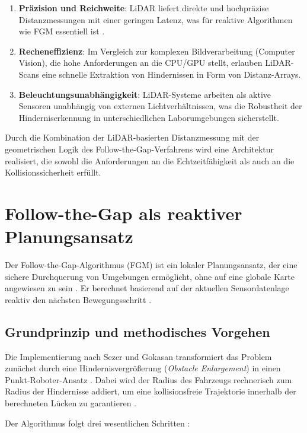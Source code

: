 \begin{enumerate}
    \item \textbf{Präzision und Reichweite}: LiDAR liefert direkte und hochpräzise Distanzmessungen mit einer geringen Latenz, was für reaktive Algorithmen wie FGM essentiell ist \cite{sezer2012}.
    \item \textbf{Recheneffizienz}: Im Vergleich zur komplexen Bildverarbeitung (Computer Vision), die hohe Anforderungen an die CPU/GPU stellt, erlauben LiDAR-Scans eine schnelle Extraktion von Hindernissen in Form von Distanz-Arrays.
    \item \textbf{Beleuchtungsunabhängigkeit}: LiDAR-Systeme arbeiten als aktive Sensoren unabhängig von externen Lichtverhältnissen, was die Robustheit der Hinderniserkennung in unterschiedlichen Laborumgebungen sicherstellt.
\end{enumerate}

Durch die Kombination der LiDAR-basierten Distanzmessung mit der geometrischen Logik des Follow-the-Gap-Verfahrens wird eine Architektur realisiert, die sowohl die Anforderungen an die Echtzeitfähigkeit als auch an die Kollisionssicherheit erfüllt.

\section{Follow-the-Gap als reaktiver Planungsansatz}

Der Follow-the-Gap-Algorithmus (FGM) ist ein lokaler Planungsansatz, der eine sichere Durchquerung von Umgebungen ermöglicht, ohne auf eine globale Karte angewiesen zu sein \cite{sezer2012}. Er berechnet basierend auf der aktuellen Sensordatenlage reaktiv den nächsten Bewegungsschritt \cite{sezer2012}.

\subsection{Grundprinzip und methodisches Vorgehen}

Die Implementierung nach Sezer und Gokasan transformiert das Problem zunächst durch eine Hindernisvergrößerung (\textit{Obstacle Enlargement}) in einen Punkt-Roboter-Ansatz \cite{sezer2012}. Dabei wird der Radius des Fahrzeugs rechnerisch zum Radius der Hindernisse addiert, um eine kollisionsfreie Trajektorie innerhalb der berechneten Lücken zu garantieren \cite{sezer2012}.

Der Algorithmus folgt drei wesentlichen Schritten \cite{sezer2012}:

